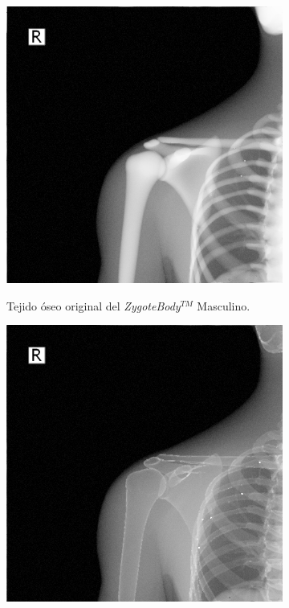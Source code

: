 \begin{figure}[h]
    \begin{subfigure}[b]{0.45\linewidth}
        \centering
        {\includegraphics[width=\linewidth]{IMG/xraynointernal.png}}
        \caption{Tejido óseo original del \emph{ZygoteBody}$^{TM}$ Masculino\label{subfig:nointernal}.}
    \end{subfigure}
    \null\hfill
     \begin{subfigure}[b]{0.45\linewidth}
        \centering
        {\includegraphics[width=\linewidth]{IMG/xrayinternal.png}}

\end{subfigure}
\end{figure}
